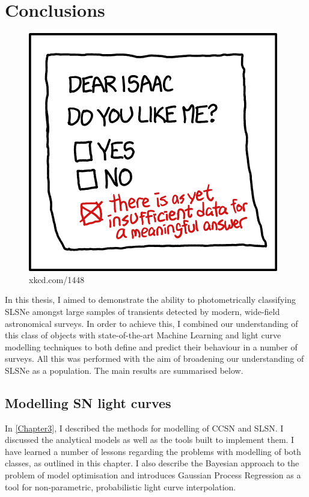 \chapter{Conclusions}
\label{Chapter6}

\begin{figure}[H]
  \centering
  \includegraphics{Figures/xkcd/chapter6.png}
  \caption*{xkcd.com/1448}
\end{figure}

In this thesis, I aimed to demonstrate the ability to photometrically classifying SLSNe amongst large samples of transients detected by modern, wide-field astronomical surveys. In order to achieve this, I combined our understanding of this class of objects with state-of-the-art Machine Learning and light curve modelling techniques to both define and predict their behaviour in a number of surveys. All this was performed with the aim of broadening our understanding of SLSNe as a population. The main results are summarised below.

\section{Modelling SN light curves}
In \cref{Chapter3}, I described the methods for modelling of CCSN and SLSN. I discussed the analytical models as well as the tools built to implement them. I have learned a number of lessons regarding the problems with modelling of both classes, as outlined in this chapter. I also describe the Bayesian approach to the problem of model optimisation and introduces Gaussian Process Regression as a tool for non-parametric, probabilistic light curve interpolation.

